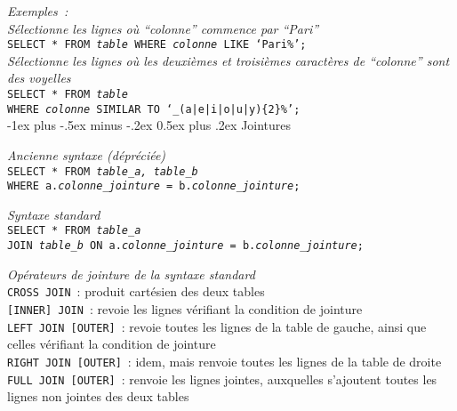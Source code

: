 \documentclass[10pt,landscape, a4paper]{article}
\makeatletter
\renewcommand{\section}{\@startsection{section}{1}{0mm}%
                                {-1ex plus -.5ex minus -.2ex}%
                                {0.5ex plus .2ex}%
                                {\normalfont\large\bfseries}}
\makeatother
\begin{document}
\begin{multicols}{3}
\emph{Exemples~:}\\
 \hspace{0.25em} {\scriptsize \emph{Sélectionne les lignes où \emph{``colonne''} commence par \emph{``Pari''}}} \\
{\scriptsize  \texttt{SELECT * FROM \emph{table} WHERE \emph{colonne} LIKE `Pari\%';}} \\

 \hspace{0.25em} {\scriptsize \emph{Sélectionne les lignes où les deuxièmes et troisièmes caractères de \emph{``colonne''} sont des voyelles}} \\
{\scriptsize  \texttt{SELECT * FROM \emph{table} \\ WHERE \emph{colonne} SIMILAR TO `\_(a|e|i|o|u|y)\{2\}\%';}} \\

\section{Jointures}

 \hspace{0.25em} {\scriptsize \emph{Ancienne syntaxe (dépréciée)}} \\
\texttt{SELECT * FROM \emph{table\_a, table\_b} \\ 
WHERE a.\emph{colonne\_jointure} = b.\emph{colonne\_jointure};}


 \hspace{0.25em} {\scriptsize \emph{Syntaxe standard}} \\
\texttt{SELECT * FROM \emph{table\_a} \\ JOIN \emph{table\_b} ON a.\emph{colonne\_jointure} = b.\emph{colonne\_jointure};}

\hspace{0.25em} {\scriptsize \emph{Opérateurs de jointure de la syntaxe standard}} \\
\texttt{CROSS JOIN}~: produit cartésien des deux tables\\ 
\texttt{[INNER] JOIN}~: revoie les lignes vérifiant la condition de jointure\\
\texttt{LEFT JOIN [OUTER]}~: revoie toutes les lignes de la table de gauche, ainsi que celles vérifiant la condition de jointure\\
\texttt{RIGHT JOIN [OUTER]}~: idem, mais renvoie toutes les lignes de la table de droite\\
 \texttt{FULL JOIN [OUTER]}~: renvoie les lignes jointes, auxquelles s'ajoutent toutes les lignes non jointes des deux tables\\
 

\end{multicols}
\end{document}
